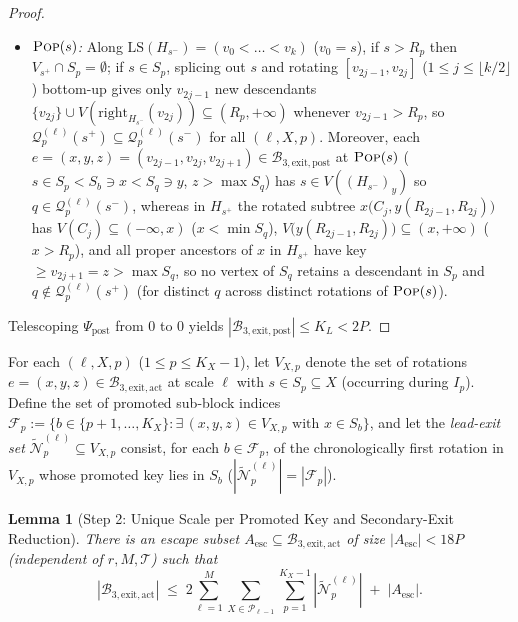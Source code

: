 \documentclass[11pt]{article}
\newtheorem{lemma}[theorem]{Lemma}
\theoremstyle{definition}
\theoremstyle{remark}
\newcommand{\LS}{\mathrm{LS}}
\newcommand{\POP}{\textnormal{\scshape Pop}}
\begin{document}
\begin{proof}
\begin{itemize}[leftmargin=2em]
  \item \emph{$\POP(s)$:} Along $\LS(H_{s^-}) = (v_0 < \dots < v_k)$ ($v_0 = s$), if $s > R_p$ then $V_{s^+} \cap S_p = \emptyset$; if $s \in S_p$, splicing out $s$ and rotating $[v_{2j-1}, v_{2j}]$ ($1 \le j \le \lfloor k/2 \rfloor$) bottom-up gives only $v_{2j-1}$ new descendants $\{v_{2j}\} \cup V(\mathrm{right}_{H_{s^-}}(v_{2j})) \subseteq (R_p, +\infty)$ whenever $v_{2j-1} > R_p$, so $\mathcal{Q}_p^{(\ell)}(s^+) \subseteq \mathcal{Q}_p^{(\ell)}(s^-)$ for all $(\ell, X, p)$. Moreover, each $e = (x, y, z) = (v_{2j-1}, v_{2j}, v_{2j+1}) \in \mathcal{B}_{3,\mathrm{exit,post}}$ at $\POP(s)$ ($s \in S_p < S_b \ni x < S_q \ni y$, $z > \max S_q$) has $s \in V((H_{s^-})_y)$ so $q \in \mathcal{Q}_p^{(\ell)}(s^-)$, whereas in $H_{s^+}$ the rotated subtree $x\big(C_j, y(R_{2j-1}, R_{2j})\big)$ has $V(C_j) \subseteq (-\infty, x)$ ($x < \min S_q$), $V\big(y(R_{2j-1}, R_{2j})\big) \subseteq (x, +\infty)$ ($x > R_p$), and all proper ancestors of $x$ in $H_{s^+}$ have key $\ge v_{2j+1} = z > \max S_q$, so no vertex of $S_q$ retains a descendant in $S_p$ and $q \notin \mathcal{Q}_p^{(\ell)}(s^+)$ (for distinct $q$ across distinct rotations of $\POP(s)$).
\end{itemize}
Telescoping $\Psi_{\mathrm{post}}$ from $0$ to $0$ yields $|\mathcal{B}_{3,\mathrm{exit,post}}| \le K_L < 2P$.
\end{proof}

For each $(\ell, X, p)$ ($1 \le p \le K_X - 1$), let $V_{X, p}$ denote the set of rotations $e = (x, y, z) \in \mathcal{B}_{3,\mathrm{exit,act}}$ at scale $\ell$ with $s \in S_p \subseteq X$ (occurring during $I_p$). Define the set of promoted sub-block indices $\mathcal{F}_p := \{b \in \{p + 1, \dots, K_X\} : \exists\,(x, y, z) \in V_{X, p} \text{ with } x \in S_b\}$, and let the \emph{lead-exit set} $\widetilde{\mathcal{N}}_p^{(\ell)} \subseteq V_{X, p}$ consist, for each $b \in \mathcal{F}_p$, of the chronologically first rotation in $V_{X, p}$ whose promoted key lies in $S_b$ ($|\widetilde{\mathcal{N}}_p^{(\ell)}| = |\mathcal{F}_p|$).

\begin{lemma}[Step 2: Unique Scale per Promoted Key and Secondary-Exit Reduction]
\label{lem:b3-escape}
There is an escape subset $A_{\mathrm{esc}} \subseteq \mathcal{B}_{3,\mathrm{exit,act}}$ of size $|A_{\mathrm{esc}}| < 18 P$ (independent of $r, M, \mathcal{T}$) such that
\[
|\mathcal{B}_{3,\mathrm{exit,act}}| \;\le\; 2 \sum_{\ell=1}^M \sum_{X \in \mathcal{P}_{\ell-1}} \sum_{p=1}^{K_X - 1} |\widetilde{\mathcal{N}}_p^{(\ell)}| \;+\; |A_{\mathrm{esc}}|.
\]
\end{lemma}
\end{document}
